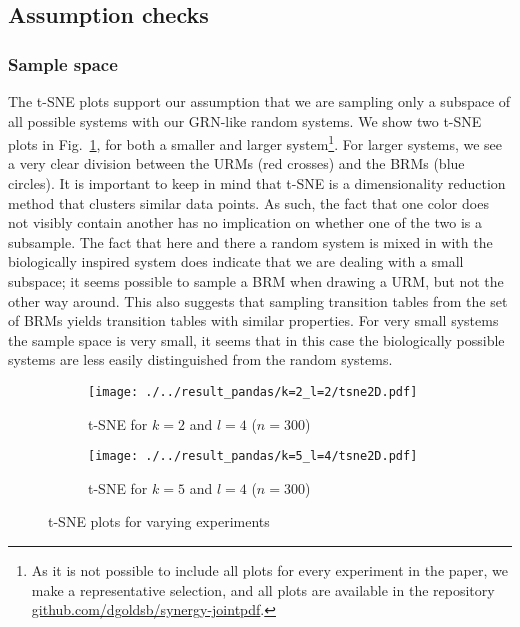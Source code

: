 \documentclass[../main.tex]{subfiles}
\begin{document}
\subsection{Assumption checks}

\subsubsection{Sample space}

The t-SNE plots support our assumption that we are sampling only a subspace of all possible systems with our GRN-like random systems.
We show two t-SNE plots in Fig.~\ref{fig:TSNE}, for both a smaller and larger system\footnote{As it is not possible to include all plots for every experiment in the paper, we make a representative selection, and all plots are available in the repository \url{github.com/dgoldsb/synergy-jointpdf}.}.
For larger systems, we see a very clear division between the URMs (red crosses) and the BRMs (blue circles).
It is important to keep in mind that t-SNE is a dimensionality reduction method that clusters similar data points.
As such, the fact that one color does not visibly contain another has no implication on whether one of the two is a subsample.
The fact that here and there a random system is mixed in with the biologically inspired system does indicate that we are dealing with a small subspace; it seems possible to sample a BRM when drawing a URM, but not the other way around.
This also suggests that sampling transition tables from the set of BRMs yields transition tables with similar properties.
For very small systems the sample space is very small, it seems that in this case the biologically possible systems are less easily distinguished from the random systems.

\begin{figure}[ht]
    \centering
    \begin{subfigure}[b]{0.48\textwidth}
        \texttt{[image: ./../result\_pandas/k=2\_l=2/tsne2D.pdf]}
        \caption{t-SNE for $k=2$ and $l=4$ ($n=300$)}
    \end{subfigure}
    \begin{subfigure}[b]{0.48\textwidth}
        \texttt{[image: ./../result\_pandas/k=5\_l=4/tsne2D.pdf]}
        \caption{t-SNE for $k=5$ and $l=4$ ($n=300$)}
    \end{subfigure}
    \caption{t-SNE plots for varying experiments}
    \label{fig:TSNE}
\end{figure}
\end{document}
